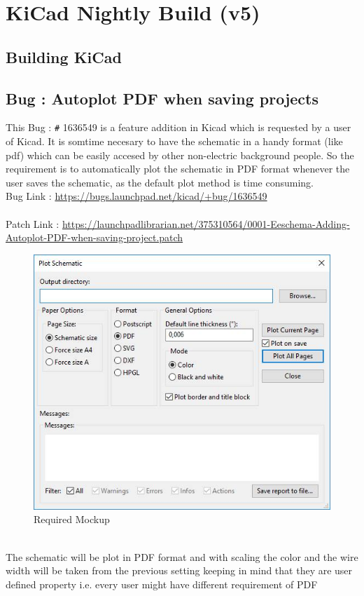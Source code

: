 \documentclass[12pt,a4paper]{report}
\begin{document}
\chapter{\textbf{KiCad Nightly Build (v5)}}
\section{Building KiCad} 
\section{Bug : Autoplot PDF when saving projects}
This Bug : \verb!#! 1636549 is a feature addition in Kicad which is requested by a user of Kicad. It is somtime necesary to have the schematic in a handy format (like pdf) which can be easily accesed by other non-electric background people. So the requirement is to automatically plot the schematic in PDF format whenever the user saves the schematic, as the default plot method is time consuming.
\vspace{3mm}
\\
Bug Link : \url{https://bugs.launchpad.net/kicad/+bug/1636549}
\\
\\
Patch Link : \url{https://launchpadlibrarian.net/375310564/0001-Eeschema-Adding-Autoplot-PDF-when-saving-project.patch}
\begin{figure}[h]
	\centering
	\includegraphics[scale=0.4]{ki_bug_1}
	\caption{Required Mockup}
\end{figure}
\\
The schematic will be plot in PDF format and with scaling the color and the wire width will be taken from the previous setting keeping in mind that they are user defined property i.e. every user might have different requirement of PDF
\end{document}
